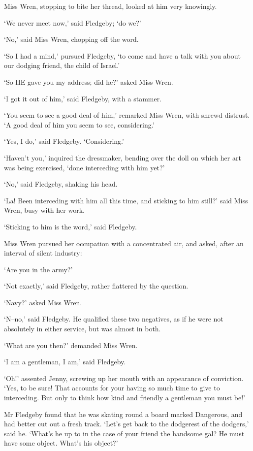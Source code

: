 Miss Wren, stopping to bite her thread, looked at him very knowingly.

‘We never meet now,’ said Fledgeby; ‘do we?’

‘No,’ said Miss Wren, chopping off the word.

‘So I had a mind,’ pursued Fledgeby, ‘to come and have a talk with you
about our dodging friend, the child of Israel.’

‘So HE gave you my address; did he?’ asked Miss Wren.

‘I got it out of him,’ said Fledgeby, with a stammer.

‘You seem to see a good deal of him,’ remarked Miss Wren, with shrewd
distrust. ‘A good deal of him you seem to see, considering.’

‘Yes, I do,’ said Fledgeby. ‘Considering.’

‘Haven’t you,’ inquired the dressmaker, bending over the doll on which
her art was being exercised, ‘done interceding with him yet?’

‘No,’ said Fledgeby, shaking his head.

‘La! Been interceding with him all this time, and sticking to him
still?’ said Miss Wren, busy with her work.

‘Sticking to him is the word,’ said Fledgeby.

Miss Wren pursued her occupation with a concentrated air, and asked,
after an interval of silent industry:

‘Are you in the army?’

‘Not exactly,’ said Fledgeby, rather flattered by the question.

‘Navy?’ asked Miss Wren.

‘N--no,’ said Fledgeby. He qualified these two negatives, as if he were
not absolutely in either service, but was almost in both.

‘What are you then?’ demanded Miss Wren.

‘I am a gentleman, I am,’ said Fledgeby.

‘Oh!’ assented Jenny, screwing up her mouth with an appearance of
conviction. ‘Yes, to be sure! That accounts for your having so much
time to give to interceding. But only to think how kind and friendly a
gentleman you must be!’

Mr Fledgeby found that he was skating round a board marked Dangerous,
and had better cut out a fresh track. ‘Let’s get back to the dodgerest
of the dodgers,’ said he. ‘What’s he up to in the case of your friend
the handsome gal? He must have some object. What’s his object?’

